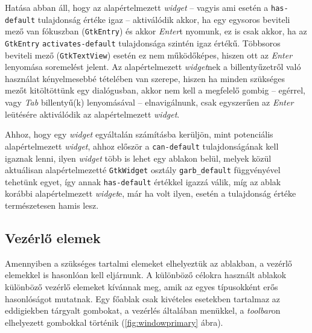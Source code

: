 Hatása abban áll, hogy az alapértelmezett \textit{widget} -- vagyis ami esetén a \texttt{has-default} tulajdonság értéke igaz -- aktiválódik akkor, ha egy egysoros beviteli mező van fókuszban (\texttt{GtkEntry}) és akkor \textit{Enter}t nyomunk, ez is csak akkor, ha az \texttt{GtkEntry} \texttt{activates-default} tulajdonsága szintén igaz értékű. Többsoros beviteli mező (\texttt{GtkTextView}) esetén ez nem működőképes, hiszen ott az \textit{Enter} lenyomása soremelést jelent. Az alapértelmezett \textit{widget}nek a billentyűzetről való használat kényelmesebbé tételében van szerepe, hiszen ha minden szükséges mezőt kitöltöttünk egy dialógusban, akkor nem kell a megfelelő gombig -- egérrel, vagy \textit{Tab} billentyű(k) lenyomásával -- elnavigálnunk, csak egyszerűen az \textit{Enter} leütésére aktiválódik az alapértelmezett \textit{widget}.

Ahhoz, hogy egy \textit{widget} egyáltalán számításba kerüljön, mint potenciális alapértelmezett \textit{widget}, ahhoz először a \texttt{can-default} tulajdonságának kell igaznak lenni, ilyen \textit{widget} több is lehet egy ablakon belül, melyek közül aktuálisan alapértelmezetté \texttt{GtkWidget} osztály \texttt{garb\_default} függvényével tehetünk egyet, így annak \texttt{has-default} értékkel igazzá válik, míg az ablak korábbi alapértelmezett \textit{widget}e, már ha volt ilyen, esetén a tulajdonság értéke természetesen hamis lesz.

\subsection{Vezérlő elemek}
\label{sec:windowvsdialog}

Amennyiben a szükséges tartalmi elemeket elhelyeztük az ablakban, a vezérlő elemekkel is hasonlóan kell eljárnunk. A különböző célokra használt ablakok különböző vezérlő elemeket kívánnak meg, amik az egyes típusokként erős hasonlóságot mutatnak. Egy főablak csak kivételes esetekben tartalmaz az eddigiekben tárgyalt gombokat, a vezérlés általában menükkel, a \textit{toolbar}on elhelyezett gombokkal történik (\ref{fig:windowprimary} ábra).

